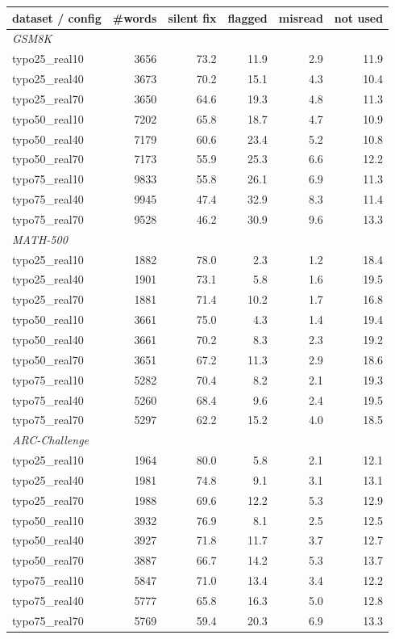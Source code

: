 \begin{tabular}{l r rrrr}
\toprule
dataset / config & \#words & silent fix & flagged & misread & not used \\
\midrule
\multicolumn{6}{l}{\emph{GSM8K}} \\
\quad typo25\_real10 & 3656 & 73.2 & 11.9 & 2.9 & 11.9 \\
\quad typo25\_real40 & 3673 & 70.2 & 15.1 & 4.3 & 10.4 \\
\quad typo25\_real70 & 3650 & 64.6 & 19.3 & 4.8 & 11.3 \\
\quad typo50\_real10 & 7202 & 65.8 & 18.7 & 4.7 & 10.9 \\
\quad typo50\_real40 & 7179 & 60.6 & 23.4 & 5.2 & 10.8 \\
\quad typo50\_real70 & 7173 & 55.9 & 25.3 & 6.6 & 12.2 \\
\quad typo75\_real10 & 9833 & 55.8 & 26.1 & 6.9 & 11.3 \\
\quad typo75\_real40 & 9945 & 47.4 & 32.9 & 8.3 & 11.4 \\
\quad typo75\_real70 & 9528 & 46.2 & 30.9 & 9.6 & 13.3 \\
\multicolumn{6}{l}{\emph{MATH-500}} \\
\quad typo25\_real10 & 1882 & 78.0 & 2.3 & 1.2 & 18.4 \\
\quad typo25\_real40 & 1901 & 73.1 & 5.8 & 1.6 & 19.5 \\
\quad typo25\_real70 & 1881 & 71.4 & 10.2 & 1.7 & 16.8 \\
\quad typo50\_real10 & 3661 & 75.0 & 4.3 & 1.4 & 19.4 \\
\quad typo50\_real40 & 3661 & 70.2 & 8.3 & 2.3 & 19.2 \\
\quad typo50\_real70 & 3651 & 67.2 & 11.3 & 2.9 & 18.6 \\
\quad typo75\_real10 & 5282 & 70.4 & 8.2 & 2.1 & 19.3 \\
\quad typo75\_real40 & 5260 & 68.4 & 9.6 & 2.4 & 19.5 \\
\quad typo75\_real70 & 5297 & 62.2 & 15.2 & 4.0 & 18.5 \\
\multicolumn{6}{l}{\emph{ARC-Challenge}} \\
\quad typo25\_real10 & 1964 & 80.0 & 5.8 & 2.1 & 12.1 \\
\quad typo25\_real40 & 1981 & 74.8 & 9.1 & 3.1 & 13.1 \\
\quad typo25\_real70 & 1988 & 69.6 & 12.2 & 5.3 & 12.9 \\
\quad typo50\_real10 & 3932 & 76.9 & 8.1 & 2.5 & 12.5 \\
\quad typo50\_real40 & 3927 & 71.8 & 11.7 & 3.7 & 12.7 \\
\quad typo50\_real70 & 3887 & 66.7 & 14.2 & 5.3 & 13.7 \\
\quad typo75\_real10 & 5847 & 71.0 & 13.4 & 3.4 & 12.2 \\
\quad typo75\_real40 & 5777 & 65.8 & 16.3 & 5.0 & 12.8 \\
\quad typo75\_real70 & 5769 & 59.4 & 20.3 & 6.9 & 13.3 \\
\bottomrule
\end{tabular}
